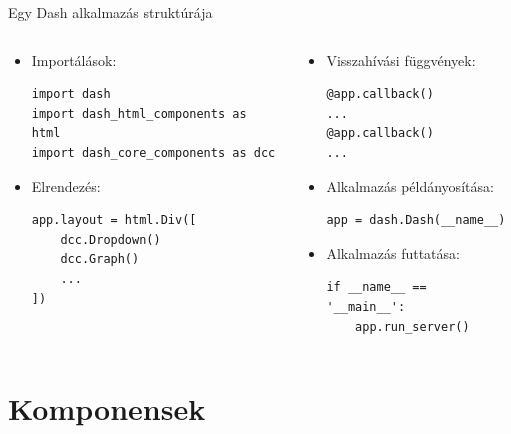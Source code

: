 \documentclass[english, aspectratio=169]{beamer}
\makeatletter
\let\origtableofcontents=\tableofcontents
\def\tableofcontents{\@ifnextchar[{\origtableofcontents}{\gobbletableofcontents}}
\def\gobbletableofcontents#1{\origtableofcontents}
\makeatother
\begin{document}
	\begin{frame}[fragile]{Egy Dash alkalmazás struktúrája}
		\begin{columns}
			\begin{column}{.5\textwidth}
				\begin{itemize}
					\item Importálások:
					\begin{lstlisting}
import dash
import dash_html_components as html
import dash_core_components as dcc
					\end{lstlisting}
					\item Elrendezés:
					\begin{lstlisting}
app.layout = html.Div([
	dcc.Dropdown()
	dcc.Graph()
	...	
])
					\end{lstlisting}
				\end{itemize}
			\end{column}
			\begin{column}{.5\textwidth}
				\begin{itemize}
					\item Visszahívási függvények:
					\begin{lstlisting}
@app.callback()
...
@app.callback()
...
					\end{lstlisting}
					\item Alkalmazás példányosítása:
					\begin{lstlisting}
app = dash.Dash(__name__)
					\end{lstlisting}
					\item Alkalmazás futtatása:
					\begin{lstlisting}
if __name__ == '__main__':
	app.run_server()
					\end{lstlisting}
				\end{itemize}
			\end{column}
		\end{columns}
	\end{frame}
	
	\section{Komponensek}
	
	\begin{frame}
		\tableofcontents[currentsection]
	\end{frame}
	
\end{document}
